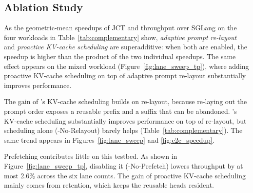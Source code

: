 \subsection{Ablation Study}
As the geometric-mean speedups of JCT and throughput over SGLang on the four workloads in Table~\ref{tab:complementary} show, \emph{adaptive prompt re-layout} and \emph{proactive KV-cache scheduling} are superadditive: when both are enabled, the speedup is higher than the product of the two individual speedups. The same effect appears on the mixed workload (Figure~\ref{fig:lane_sweep_tp}), where adding proactive KV-cache scheduling on top of adaptive prompt re-layout substantially improves performance.

The gain of \sysname's KV-cache scheduling builds on re-layout, because re-laying out the prompt order exposes a reusable prefix and a suffix that can be abandoned. \sysname's KV-cache scheduling substantially improves performance on top of re-layout, but scheduling alone (\sysname-No-Relayout) barely helps (Table~\ref{tab:complementary}). The same trend appears in Figures~\ref{fig:lane_sweep} and \ref{fig:e2e_speedup}.

Prefetching contributes little on this testbed. As shown in Figure~\ref{fig:lane_sweep_tp}, disabling it (\sysname-No-Prefetch) lowers throughput by at most 2.6\% across the six lane counts. The gain of proactive KV-cache scheduling mainly comes from retention, which keeps the reusable heads resident.

